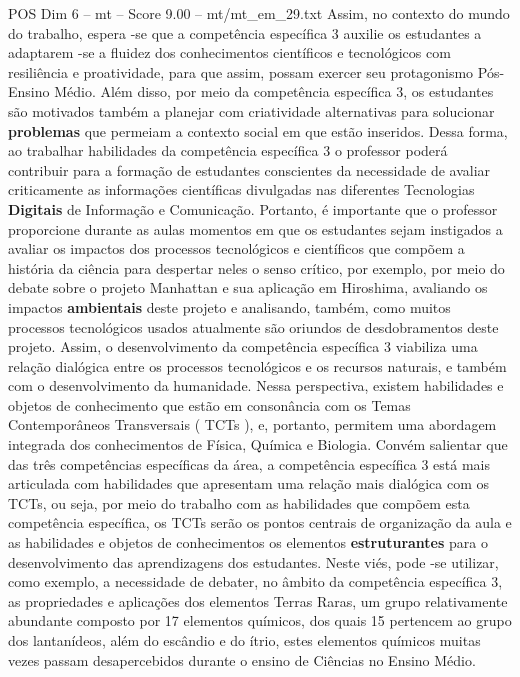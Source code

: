 \begin{textsample}{POS Dim 6 – mt – Score 9.00 – mt/mt\_em\_29.txt}
Assim, no contexto do mundo do trabalho, espera -se que a competência específica 3 auxilie os estudantes a adaptarem -se a fluidez dos conhecimentos científicos e tecnológicos com resiliência e proatividade, para que assim, possam exercer seu protagonismo Pós-Ensino Médio.
Além disso, por meio da competência específica 3, os estudantes são motivados também a planejar com criatividade alternativas para solucionar \textbf{problemas} que permeiam a contexto social em que estão inseridos.
Dessa forma, ao trabalhar habilidades da competência específica 3 o professor poderá contribuir para a formação de estudantes conscientes da necessidade de avaliar criticamente as informações científicas divulgadas nas diferentes Tecnologias \textbf{Digitais} de Informação e Comunicação.
Portanto, é importante que o professor proporcione durante as aulas momentos em que os estudantes sejam instigados a avaliar os impactos dos processos tecnológicos e científicos que compõem a história da ciência para despertar neles o senso crítico, por exemplo, por meio do debate sobre o projeto Manhattan e sua aplicação em Hiroshima, avaliando os impactos \textbf{ambientais} deste projeto e analisando, também, como muitos processos tecnológicos usados atualmente são oriundos de desdobramentos deste projeto.
Assim, o desenvolvimento da competência específica 3 viabiliza uma relação dialógica entre os processos tecnológicos e os recursos naturais, e também com o desenvolvimento da humanidade.
Nessa perspectiva, existem habilidades e objetos de conhecimento que estão em consonância com os Temas Contemporâneos Transversais ( TCTs ), e, portanto, permitem uma abordagem integrada dos conhecimentos de Física, Química e Biologia.
Convém salientar que das três competências específicas da área, a competência específica 3 está mais articulada com habilidades que apresentam uma relação mais dialógica com os TCTs, ou seja, por meio do trabalho com as habilidades que compõem esta competência específica, os TCTs serão os pontos centrais de organização da aula e as habilidades e objetos de conhecimentos os elementos \textbf{estruturantes} para o desenvolvimento das aprendizagens dos estudantes.
Neste viés, pode -se utilizar, como exemplo, a necessidade de debater, no âmbito da competência específica 3, as propriedades e aplicações dos elementos Terras Raras, um grupo relativamente abundante composto por 17 elementos químicos, dos quais 15 pertencem ao grupo dos lantanídeos, além do escândio e do ítrio, estes elementos químicos muitas vezes passam desapercebidos durante o ensino de Ciências no Ensino Médio.

\end{textsample}
